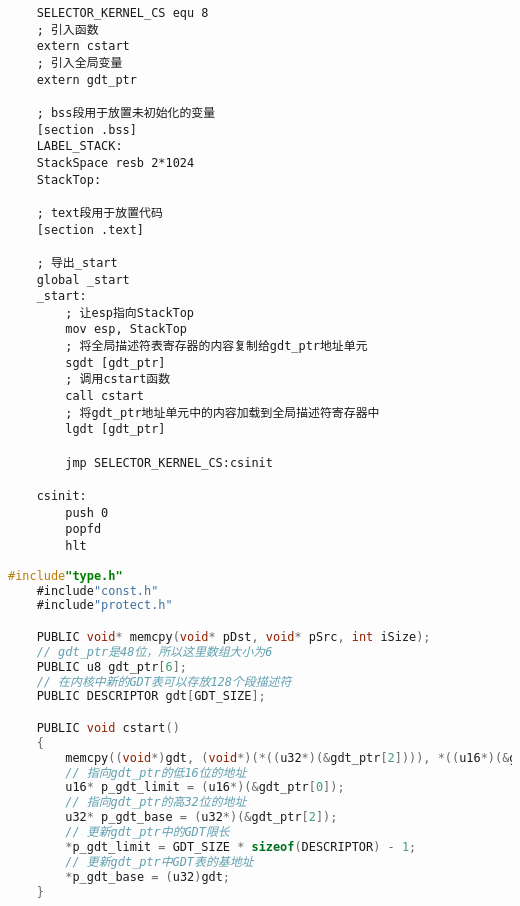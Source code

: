 \documentclass[a4paper,left=2.5cm,right=2.5cm,11pt]{article}
\begin{document}
	\begin{lstlisting}
	SELECTOR_KERNEL_CS equ 8
	; 引入函数
	extern cstart
	; 引入全局变量
	extern gdt_ptr

	; bss段用于放置未初始化的变量
	[section .bss]
	LABEL_STACK:
	StackSpace resb 2*1024
	StackTop:

	; text段用于放置代码
	[section .text]
	
	; 导出_start
	global _start
	_start:
		; 让esp指向StackTop
		mov esp, StackTop
		; 将全局描述符表寄存器的内容复制给gdt_ptr地址单元
		sgdt [gdt_ptr]
		; 调用cstart函数
		call cstart
		; 将gdt_ptr地址单元中的内容加载到全局描述符寄存器中
		lgdt [gdt_ptr]

		jmp SELECTOR_KERNEL_CS:csinit

	csinit:
		push 0
		popfd
		hlt
	\end{lstlisting}

	\begin{lstlisting}[language = C]
	#include"type.h"
	#include"const.h"
	#include"protect.h"

	PUBLIC void* memcpy(void* pDst, void* pSrc, int iSize);
	// gdt_ptr是48位，所以这里数组大小为6
	PUBLIC u8 gdt_ptr[6];
	// 在内核中新的GDT表可以存放128个段描述符
	PUBLIC DESCRIPTOR gdt[GDT_SIZE];

	PUBLIC void cstart()
	{
		memcpy((void*)gdt, (void*)(*((u32*)(&gdt_ptr[2]))), *((u16*)(&gdt_ptr[0]))+1);
		// 指向gdt_ptr的低16位的地址
		u16* p_gdt_limit = (u16*)(&gdt_ptr[0]);
		// 指向gdt_ptr的高32位的地址
		u32* p_gdt_base = (u32*)(&gdt_ptr[2]);
		// 更新gdt_ptr中的GDT限长
		*p_gdt_limit = GDT_SIZE * sizeof(DESCRIPTOR) - 1;
		// 更新gdt_ptr中GDT表的基地址
		*p_gdt_base = (u32)gdt;
	}
	\end{lstlisting}
\end{document}
